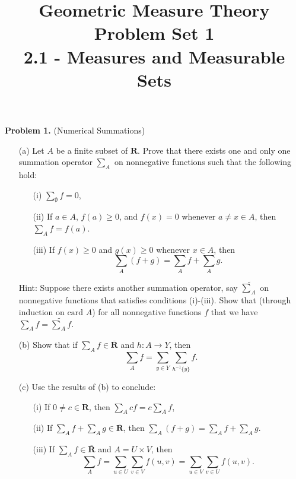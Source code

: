 \documentclass[10pt]{article}
\title{\selectfont\textbf{ Geometric Measure Theory} \\
	Problem Set 1 \\ \normalsize{2.1 - Measures and Measurable Sets}}
\date{}
\begin{document}
	\maketitle
	
	\noindent \textbf{Problem 1.} (Numerical Summations) 
		\begin{itemize}
			\item[(a)] Let $A$ be a finite subset of $\mathbf{R}$. Prove that there exists one and only one summation operator $\sum_A$ on nonnegative functions such that the following hold:
				\begin{itemize}
					\item[(i)] $\sum_\emptyset f = 0$,
					\item[(ii)] If $a \in A$, $f(a) \geq 0$, and $f(x) = 0$ whenever $a \neq x \in A$, then $\sum_A f = f(a)$. 
					\item[(iii)] If $f(x) \geq 0$ and $g(x) \geq 0$ whenever $x \in A$, then $$\sum_A (f + g) = \sum_A f + \sum_A g.$$ 
				\end{itemize}
			Hint: Suppose there exists another summation operator, say $\widetilde{\sum}_A$ on nonnegative functions that satisfies conditions (i)-(iii). Show that (through induction on $\text{card } A$) for all nonnegative functions $f$ that we have $\sum_A f = \widetilde{\sum}_A f$. 
			
			\item[(b)] Show that if $\sum_A f \in \overline{\mathbf{R}}$ and $h: A \to Y$, then $$\sum_A f = \sum_{y \in Y} \sum_{h^{-1}\{y\}} f.$$
			
			\item[(c)] Use the results of (b) to conclude:
				\begin{itemize}
					\item[(i)]  If $0 \neq c \in \mathbf{R}$, then $\sum_A cf = c \sum_A f$,
					
					\item[(ii)] If $\sum_A f + \sum_A g \in \overline{\mathbf{R}}$, then $\sum_A (f + g) = \sum_A f + \sum_A g$. 
					
					\item[(iii)] If $\sum_A f \in \overline{\mathbf{R}}$ and $A = U \times V$, then $$\sum_A f = \sum_{u \in U} \sum_{v \in V} f(u, v) = \sum_{u \in V} \sum_{v \in U} f(u, v).$$
				\end{itemize}
		\end{itemize}
	
\end{document}
